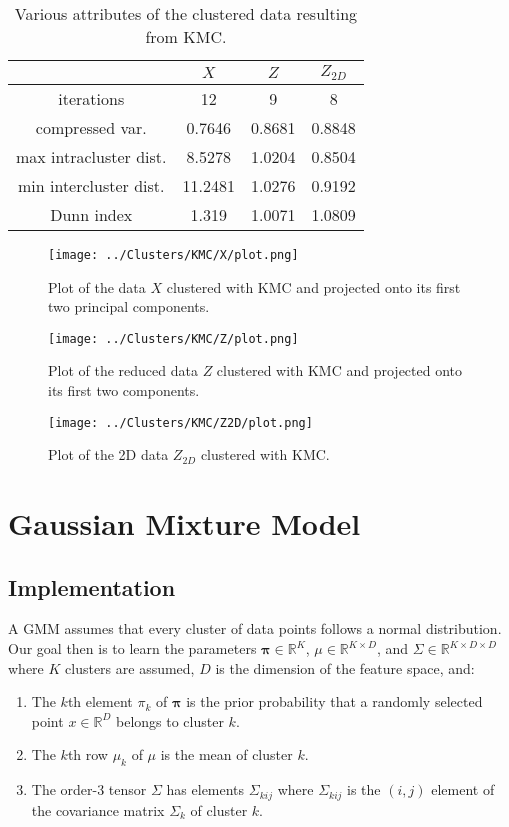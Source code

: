 \documentclass[12pt]{article}
\newcommand{\RR}{\mathbb{R}}
\begin{document}
\begin{table}
\centering
\begin{tabular}{|c|c|c|c|} \hline
\quad & $X$ & $Z$ & $Z_{2D}$ \\ \hline
iterations & 12 & 9 & 8 \\ \hline
compressed var. & 0.7646 & 0.8681 & 0.8848 \\ \hline
max intracluster dist. & 8.5278 & 1.0204 & 0.8504 \\ \hline
min intercluster dist. & 11.2481 & 1.0276 & 0.9192 \\ \hline
Dunn index & 1.319 & 1.0071 & 1.0809 \\ \hline
\end{tabular}
\caption{\label{KMC-table} Various attributes of the clustered data resulting from KMC.}
\end{table}

\begin{figure}
\centering
\texttt{[image: ../Clusters/KMC/X/plot.png]}
\caption{\label{KMC-X} Plot of the data $X$ clustered with KMC and projected onto its first two principal components.}
\end{figure}

\begin{figure}
\centering
\texttt{[image: ../Clusters/KMC/Z/plot.png]}
\caption{\label{KMC-Z} Plot of the reduced data $Z$ clustered with KMC and projected onto its first two components.}
\end{figure}

\begin{figure}
\centering
\texttt{[image: ../Clusters/KMC/Z2D/plot.png]}
\caption{\label{KMC-Z2D} Plot of the 2D data $Z_{2D}$ clustered with KMC.}
\end{figure}

\section{Gaussian Mixture Model}

\subsection{Implementation}

A GMM assumes that every cluster of data points follows a normal distribution. Our goal then is to learn the parameters $\mathbf{\pi}\in\mathbb{R}^K$, $\mu\in\mathbb{R}^{K\times D}$, and $\Sigma\in\mathbb{R}^{K\times D\times D}$ where $K$ clusters are assumed, $D$ is the dimension of the feature space, and:
\begin{enumerate}
\item The $k$th element $\pi_k$ of $\mathbf{\pi}$ is the prior probability that a randomly selected point $x\in\RR^D$ belongs to cluster $k$.
\item The $k$th row $\mu_k$ of $\mu$ is the mean of cluster $k$.
\item The order-3 tensor $\Sigma$ has elements $\Sigma_{kij}$ where $\Sigma_{kij}$ is the $(i,j)$ element of the covariance matrix $\Sigma_k$ of cluster $k$.
\end{enumerate}
\end{document}

